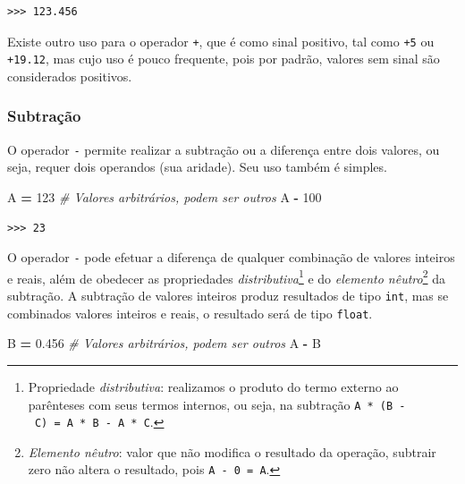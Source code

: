 \documentclass[
]{book}
\newenvironment{Shaded}{\begin{snugshade}}{\end{snugshade}}
\newcommand{\CommentTok}[1]{\textcolor[rgb]{0.56,0.35,0.01}{\textit{#1}}}
\newcommand{\DecValTok}[1]{\textcolor[rgb]{0.00,0.00,0.81}{#1}}
\newcommand{\FloatTok}[1]{\textcolor[rgb]{0.00,0.00,0.81}{#1}}
\newcommand{\NormalTok}[1]{#1}
\newcommand{\OperatorTok}[1]{\textcolor[rgb]{0.81,0.36,0.00}{\textbf{#1}}}
\begin{document}
\begin{verbatim}
>>> 123.456
\end{verbatim}

Existe outro uso para o operador \texttt{+}, que é como sinal positivo, tal como \texttt{+5} ou \texttt{+19.12}, mas cujo uso é pouco frequente, pois por padrão, valores sem sinal são considerados positivos.

\hypertarget{subtrauxe7uxe3o}{%
\subsubsection{Subtração}\label{subtrauxe7uxe3o}}

O operador \texttt{-} permite realizar a subtração ou a diferença entre dois valores, ou seja, requer dois operandos (sua aridade). Seu uso também é simples.

\begin{Shaded}
\begin{Highlighting}[]
\NormalTok{A }\OperatorTok{=} \DecValTok{123} \CommentTok{\# Valores arbitrários, podem ser outros}
\NormalTok{A }\OperatorTok{{-}} \DecValTok{100}
\end{Highlighting}
\end{Shaded}

\begin{verbatim}
>>> 23
\end{verbatim}

O operador \texttt{-} pode efetuar a diferença de qualquer combinação de valores inteiros e reais, além de obedecer as propriedades \emph{distributiva}\footnote{Propriedade \emph{distributiva}: realizamos o produto do termo externo ao parênteses com seus termos internos, ou seja, na subtração \texttt{A\ *\ (B\ -\ C)\ =\ A\ *\ B\ -\ A\ *\ C}.} e do \emph{elemento nêutro}\footnote{\emph{Elemento nêutro}: valor que não modifica o resultado da operação, subtrair zero não altera o resultado, pois \texttt{A\ -\ 0\ =\ A}.} da subtração. A subtração de valores inteiros produz resultados de tipo \texttt{int}, mas se combinados valores inteiros e reais, o resultado será de tipo \texttt{float}.

\begin{Shaded}
\begin{Highlighting}[]
\NormalTok{B }\OperatorTok{=} \FloatTok{0.456} \CommentTok{\# Valores arbitrários, podem ser outros}
\NormalTok{A }\OperatorTok{{-}}\NormalTok{ B}
\end{Highlighting}
\end{Shaded}
\end{document}

